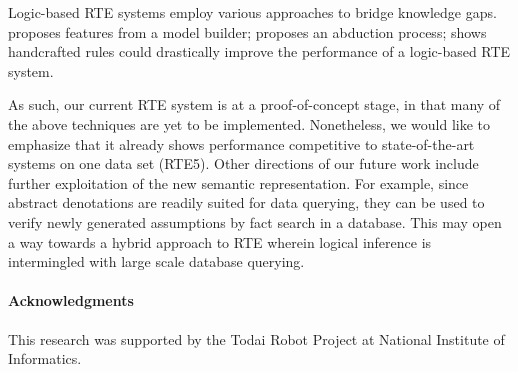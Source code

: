\documentclass[11pt]{article}
\begin{document}
Logic-based RTE systems employ various approaches to bridge knowledge gaps.  proposes 
features from a model builder;  proposes an abduction process; 
 shows handcrafted rules could drastically improve the performance of a 
logic-based RTE system. 

As such, our current RTE system is at a proof-of-concept stage, in that many of
the above techniques are yet to be implemented.
Nonetheless, we would like to emphasize that it already shows performance competitive to 
state-of-the-art systems on one data set (RTE5).
Other directions of our future work include further exploitation of the
new semantic representation.
For example, since abstract denotations are readily suited for data querying, they can be 
used to verify newly generated assumptions by fact search in a database. 
This may open a way towards a hybrid approach to RTE wherein logical inference is intermingled with 
large scale database querying.

\paragraph{Acknowledgments}
This research was supported by the Todai Robot Project at National
Institute of Informatics.



\end{document}

